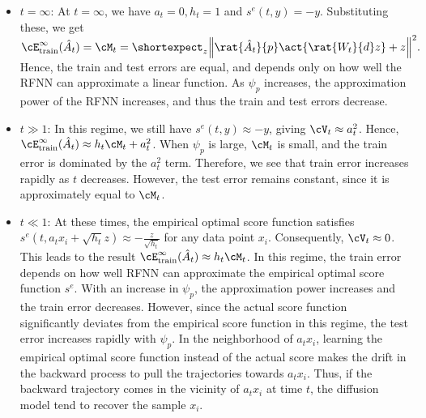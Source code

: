 \begin{itemize}
    \item \textbf{$t=\infty$}: At $t=\infty$, we have $a_t=0,h_t=1$ and $s^e(t,y)=-y$. Substituting these, we get
        $\cE^\infty_{\text{train}}(\hat{A}_t) = \cM_t = \shortexpect_z\norm{\rat{\hat{A}_t}{p}\act{\rat{W_t}{d}z}+z}^2.$
    Hence, the train and test errors are equal, and depends only on how well the RFNN can approximate a linear function. As $\psi_p$ increases, the approximation power of the RFNN increases, and thus the train and test errors decrease. 

    \item \textbf{$t\gg1$}: In this regime, we still have $s^e(t,y)\approx -y$, giving $\cV_t\approx a_t^2$. Hence, $\cE^\infty_{\text{train}}(\hat{A}_t)\approx h_t\cM_t+a_t^2$. When $\psi_p$ is large, $\cM_t$ is small, and the train error is dominated by the $a_t^2$ term. Therefore, we see that train error increases rapidly as $t$ decreases. However, the test error remains constant, since it is approximately equal to $\cM_t$.

    \item \textbf{$t\ll1$}: At these times, the empirical optimal score function satisfies $s^e(t,a_tx_i+\sqrt{h_t}z)\approx -\frac{z}{\sqrt{h_t}}$ for any data point $x_i$. Consequently, $\cV_t\approx 0$. This leads to the result $\cE^\infty_{\text{train}}(\hat{A}_t)\approx h_t\cM_t$. In this regime, the train error depends on how well RFNN can approximate the empirical optimal score function $s^e$. With an increase in $\psi_p$, the approximation power increases and the train error decreases. However, since the actual score function significantly deviates from the empirical score function in this regime, the test error increases rapidly with $\psi_p$. In the neighborhood of $a_tx_i$, learning the empirical optimal score function instead of the actual score makes the drift in the backward process to pull the trajectories towards $a_tx_i$. Thus, if the backward trajectory comes in the vicinity of $a_tx_i$ at time $t$, the diffusion model tend to recover the sample $x_i$. %

\end{itemize}
